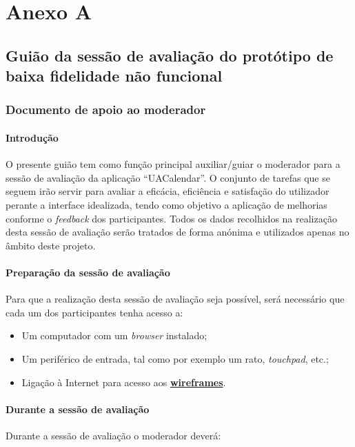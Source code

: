 \documentclass[11pt, twoside]{report}
\begin{document}
	
	
	
	\pagestyle{empty}
	
	\chapter*{Anexo A}
		\section*{Guião da sessão de avaliação do protótipo de baixa fidelidade não funcional}
		\subsection*{Documento de apoio ao moderador}
			
		
		\subsubsection*{Introdução}
	O presente guião tem como função principal auxiliar/guiar o moderador para a sessão de avaliação da aplicação “UACalendar”.
	O conjunto de tarefas que se seguem irão servir para avaliar a eficácia, eficiência e satisfação do utilizador perante a interface idealizada, tendo como objetivo a aplicação de melhorias conforme o \textit{feedback} dos participantes.
	Todos os dados recolhidos na realização desta sessão de avaliação serão tratados de forma anónima e utilizados apenas no âmbito deste projeto.
		
		
	\subsubsection*{Preparação da sessão de avaliação}
			Para que a realização desta sessão de avaliação seja possível, será necessário que cada um dos participantes tenha acesso a:
	
	\begin{itemize}
		\item Um computador com um \textit{browser} instalado;
		\item Um periférico de entrada, tal como por exemplo um rato, \textit{touchpad}, etc.;
		\item Ligação à Internet para acesso aos \href{https://www.figma.com/file/nhb5nnIrt3fdDoQhYpsN80/Calendario?node-id=9\%3A154}{\textbf{wireframes}}.
	\end{itemize}

\subsubsection*{Durante a sessão de avaliação}	
Durante a sessão de avaliação o moderador deverá:
\end{document}
